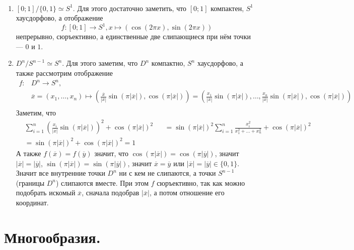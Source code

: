 \documentclass[12pt,a4paper]{article}
\begin{document}
    \begin{example}\ 
        \begin{enumerate}
            \item $[0; 1]/\{0, 1\} \simeq S^1$. Для этого достаточно заметить, что $[0; 1]$ компактен, $S^1$ хаусдорфово, а отображение
            \[f: [0; 1] \to S^1, x \mapsto (\cos(2\pi x), \sin(2\pi x))\]
            непрерывно, сюръективно, а единственные две слипающиеся при нём точки --- $0$ и $1$.
            \item $D^n/S^{n-1} \simeq S^n$. Для этого заметим, что $D^n$ компактно, $S^n$ хаусдорфово, а также рассмотрим отображение
            \begin{align*}
                f: {}&D^n \to S^n,\\
                &\overline{x} = (x_1, \dots, x_n) \mapsto \left(\frac{\overline{x}}{|\overline{x}|} \sin(\pi |\overline{x}|), \cos(\pi |\overline{x}|)\right) = \left(\frac{x_1}{|\overline{x}|} \sin(\pi |\overline{x}|), \dots, \frac{x_n}{|\overline{x}|} \sin(\pi |\overline{x}|), \cos(\pi |\overline{x}|)\right)\\
            \end{align*}
            Заметим, что
            \begin{align*}
                &\sum_{i=1}^n \left(\frac{x_i}{|\overline{x}|}\sin(\pi |\overline{x}|)\right)^2 + \cos(\pi |\overline{x}|)^2&
                &= \sin(\pi |\overline{x}|)^2 \sum_{i=1}^n \frac{x_i^2}{x_1^2 + \dots + x_n^2} + \cos(\pi |\overline{x}|)^2\\
                &= \sin(\pi |\overline{x}|)^2 + \cos(\pi |\overline{x}|)^2 = 1
            \end{align*}
            А также $f(\overline{x}) = f(\overline{y})$ значит, что $\cos(\pi |\overline{x}|) = \cos(\pi |\overline{y}|)$, значит $|\overline{x}| = |\overline{y}|$, $\sin(\pi |\overline{x}|) = \sin(\pi |\overline{y}|)$, значит $\overline{x} = \overline{y}$ или $|\overline{x}| = |\overline{y}| \in \{0, 1\}$. Значит все внутренние точки $D^n$ ни с кем не слипаются, а точки $S^{n-1}$ (границы $D^n$) слипаются вместе. При этом $f$ сюръективно, так как можно подобрать искомый $\overline{x}$, сначала подобрав $|\overline{x}|$, а потом отношение его координат.
        \end{enumerate}
    \end{example}

    \section{Многообразия.}
\end{document}
